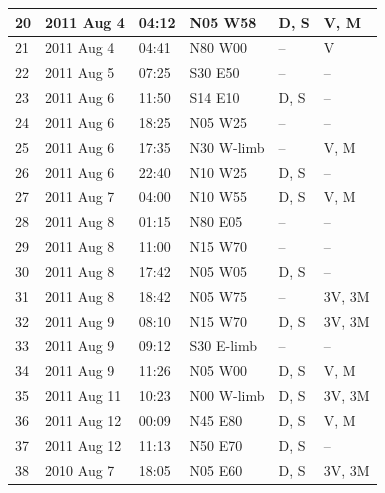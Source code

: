 \begin{table}[!h]
\begin{center}
\begin{tabular}{|l|l|l|l|l|l|}
	20 & 2011 Aug 4 & 04:12 & N05 W58 & D, S & V, M \\ \hline
	21 & 2011 Aug 4 & 04:41 & N80 W00 & -- & V \\ \hline
	22 & 2011 Aug 5 & 07:25 & S30 E50 & -- & -- \\ \hline
	23 & 2011 Aug 6 & 11:50 & S14 E10 & D, S & -- \\ \hline
	24 & 2011 Aug 6 & 18:25 & N05 W25 & -- & -- \\ \hline
	25 & 2011 Aug 6 & 17:35 & N30 W-limb & -- & V, M \\ \hline
	26 & 2011 Aug 6 & 22:40 & N10 W25 & D, S & -- \\ \hline
	27 & 2011 Aug 7 & 04:00 & N10 W55 & D, S & V, M \\ \hline
	28 & 2011 Aug 8 & 01:15 & N80 E05 & -- & -- \\ \hline
	29 & 2011 Aug 8 & 11:00 & N15 W70 & -- & -- \\ \hline
	30 & 2011 Aug 8 & 17:42 & N05 W05 & D, S & -- \\ \hline
	31 & 2011 Aug 8 & 18:42 & N05 W75 & -- & 3V, 3M \\ \hline
	32 & 2011 Aug 9 & 08:10 & N15 W70 & D, S & 3V, 3M \\ \hline
	33 & 2011 Aug 9 & 09:12 & S30 E-limb & -- & -- \\ \hline
	34 & 2011 Aug 9 & 11:26 & N05 W00 & D, S & V, M \\ \hline
	35 & 2011 Aug 11 & 10:23 & N00 W-limb & D, S & 3V, 3M \\ \hline
	36 & 2011 Aug 12 & 00:09 & N45 E80 & D, S & V, M \\ \hline
	37 & 2011 Aug 12 & 11:13 & N50 E70 & D, S & -- \\ \hline
	38 & 2010 Aug 7 & 18:05 & N05 E60 & D, S & 3V, 3M \\ \hline
	\end{tabular}
    \\ \rule{0mm}{5mm}
    \end{center}
    \label{tab:eventlist}
\end{table}



